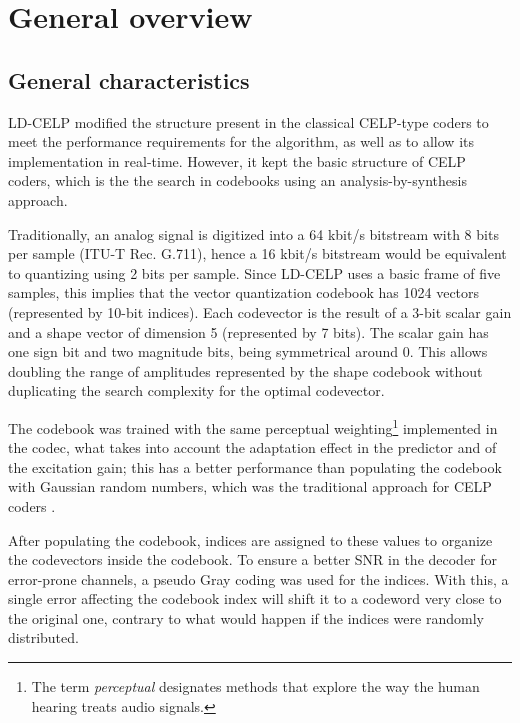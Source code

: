 \section{General overview}

\subsection{General characteristics} 

LD-CELP modified the structure present in the classical CELP-type
coders \cite{CELP-original} to meet the performance requirements for
the algorithm, as well as to allow its implementation in
real-time. However, it kept the basic structure of CELP coders, which
is the the search in codebooks using an analysis-by-synthesis approach.

Traditionally, an analog signal is digitized into a 64 kbit/s bitstream
with 8 bits per sample (ITU-T Rec. G.711), hence a 16 kbit/s
bitstream would be equivalent to quantizing using 2 bits per
sample. Since LD-CELP uses a basic frame of five samples, this implies
that the vector quantization codebook has 1024 vectors (represented
by 10-bit indices). Each codevector is the result of a 3-bit scalar
gain and a shape vector of dimension 5 (represented by 7 bits). The
scalar gain has one sign bit and two magnitude bits, being symmetrical
around 0. This allows doubling the range of amplitudes represented by
the shape codebook without duplicating the search complexity for the
optimal codevector.


The codebook was trained with the same perceptual
weighting\footnote{The term {\em perceptual} designates methods that
  explore the way the human hearing treats audio signals.} implemented
in the codec, what takes into account the adaptation effect in the
predictor and of the excitation gain; this has a better performance
than populating the codebook with Gaussian random numbers, which was
the traditional approach for CELP coders \cite{CELP-original}.

After populating the codebook, indices are assigned to these values to
organize the codevectors inside the codebook. To ensure a better SNR
in the decoder for error-prone channels, a pseudo Gray coding was used
for the indices. With this, a single error affecting the codebook
index will shift it to a codeword very close to the original one,
contrary to what would happen if the indices were randomly
distributed.

